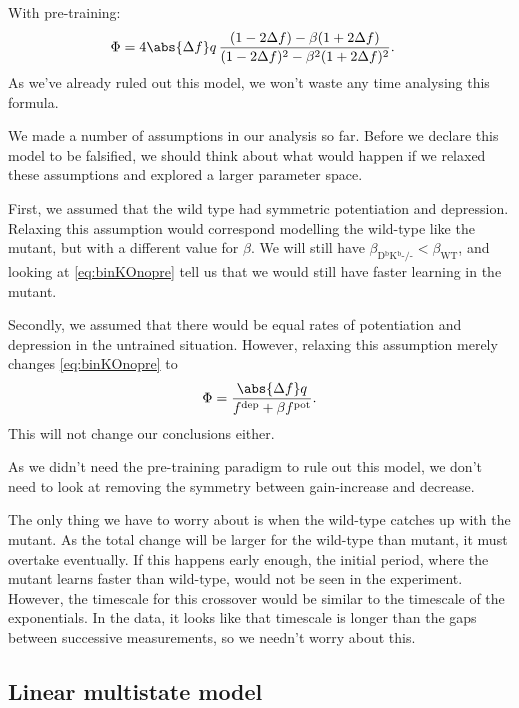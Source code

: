 \documentclass[12pt]{article}
\newcommand{\pot}{^{\text{pot}}}
\newcommand{\dep}{^{\text{dep}}}
\newcommand{\wt}{_{\text{WT}}}
\newcommand{\ko}{_{\text{D$^\mathrm{b}$K$^\mathrm{b}$-/-}}}
\begin{document}
With pre-training:
%
\begin{equation}\label{eq:binKOpre}
\begin{aligned}
  \Phi &= 4\abs{\Delta f} q \, \frac{(1-2\Delta f) - \beta(1+2\Delta f)}
          {(1-2\Delta f)^2 - \beta^2(1+2\Delta f)^2}.
\end{aligned}
\end{equation}
%
As we've already ruled out this model, we won't waste any time analysing this formula.

We made a number of assumptions in our analysis so far.
Before we declare this model to be falsified, we should think about what would happen if we relaxed these assumptions and explored a larger parameter space.

First, we assumed that the wild type had symmetric potentiation and depression.
Relaxing this assumption would correspond modelling the wild-type like the mutant, but with a different value for $\beta$.
We will still have $\beta\ko<\beta\wt$, and looking at \eqref{eq:binKOnopre} tell us that we would still have faster learning in the mutant.

Secondly, we assumed that there would be equal rates of potentiation and depression in the untrained situation.
However, relaxing this assumption merely changes \eqref{eq:binKOnopre} to
%
\begin{equation}\label{eq:binKOnoprediff}
  \Phi = \frac{\abs{\Delta f} q}{f\dep+\beta f\pot}.
\end{equation}
%
This will not change our conclusions either.

As we didn't need the pre-training paradigm to rule out this model, we don't need to look at removing the symmetry between gain-increase and decrease.

The only thing we have to worry about is when the wild-type catches up with the mutant.
As the total change will be larger for the wild-type than mutant, it must overtake eventually.
If this happens early enough, the initial period, where the mutant learns faster than wild-type, would not be seen in the experiment.
However, the timescale for this crossover would be similar to the timescale of the exponentials.
In the data, it looks like that timescale is longer than the gaps between successive measurements, so we needn't worry about this.



\subsection{Linear multistate model}\label{sec:multistate_lin}
\end{document}
